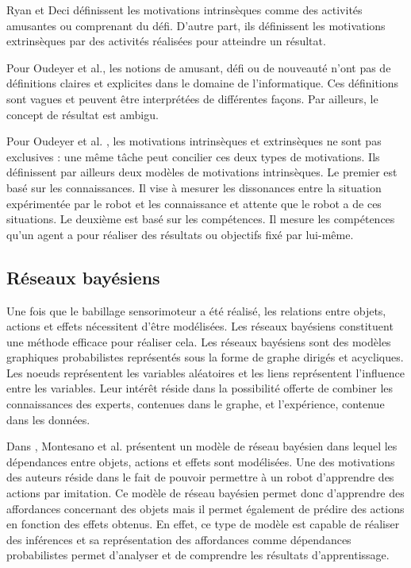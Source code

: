 \documentclass[draft]{llncs}
\begin{document}
Ryan et Deci définissent les motivations intrinsèques comme des activités amusantes ou comprenant du défi.
D'autre part, ils définissent les motivations extrinsèques par des activités réalisées pour atteindre un résultat.

Pour Oudeyer et al., les notions de \og{}amusant\fg{}, \og{}défi\fg{} ou de \og{}nouveauté\fg{} n'ont pas de définitions claires et explicites dans le domaine de l'informatique.
Ces définitions sont vagues et peuvent être interprétées de différentes façons.
Par ailleurs, le concept de résultat est ambigu.

Pour Oudeyer et al. , les motivations intrinsèques et extrinsèques ne sont pas exclusives : une même tâche peut concilier ces deux types de motivations.
Ils définissent par ailleurs deux modèles de motivations intrinsèques.
Le premier est basé sur les connaissances.
Il vise à mesurer les dissonances entre la situation expérimentée par le robot et les connaissance et attente que le robot a de ces situations.
Le deuxième est basé sur les compétences. Il mesure les compétences qu'un agent a pour réaliser des résultats ou objectifs fixé par lui-même.




\subsection{Réseaux bayésiens}

Une fois que le babillage sensorimoteur a été réalisé, les relations entre objets, actions et effets nécessitent d'être modélisées.
Les réseaux bayésiens constituent une méthode efficace pour réaliser cela. 
Les réseaux bayésiens sont des modèles graphiques probabilistes représentés sous la forme de graphe dirigés et acycliques.
Les noeuds représentent les variables aléatoires et les liens représentent l'influence entre les variables.
Leur intérêt réside dans la possibilité offerte de combiner les connaissances des experts, contenues dans le graphe, et l'expérience, contenue dans les données.

Dans \cite{Montesano2008}, Montesano et al. présentent un modèle de réseau bayésien dans lequel les dépendances entre objets, actions et effets sont modélisées.
Une des motivations des auteurs réside dans le fait de pouvoir permettre à un robot d'apprendre des actions par imitation.
Ce modèle de réseau bayésien permet donc d'apprendre des affordances concernant des objets mais il permet également de prédire des actions en fonction des effets obtenus.
En effet, ce type de modèle est capable de réaliser des inférences et sa représentation des affordances comme dépendances probabilistes permet d'analyser et de comprendre les résultats d'apprentissage.
\end{document}
